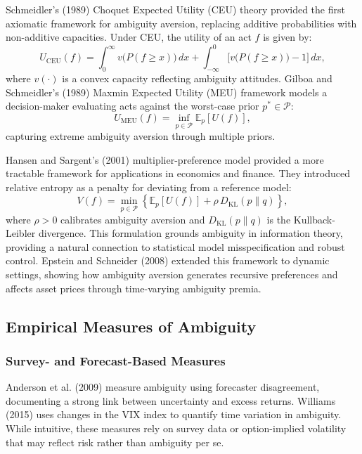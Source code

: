 \documentclass[preprint,12pt,authoryear]{elsarticle}
\begin{document}
Schmeidler's (1989) Choquet Expected Utility (CEU) theory provided the first axiomatic framework for ambiguity aversion, replacing additive probabilities with non-additive capacities. Under CEU, the utility of an act $f$ is given by:
\begin{equation}
U_{\mathrm{CEU}}(f)=\int_0^\infty v\bigl(P(f\ge x)\bigr)\,dx + \int_{-\infty}^0 \bigl[v\bigl(P(f\ge x)\bigr)-1\bigr]\,dx,
\end{equation}
where $v(\cdot)$ is a convex capacity reflecting ambiguity attitudes. Gilboa and Schmeidler's (1989) Maxmin Expected Utility (MEU) framework models a decision-maker evaluating acts against the worst-case prior $p^*\in\mathcal{P}$:
\begin{equation}
U_{\mathrm{MEU}}(f)=\inf_{p\in\mathcal{P}}\mathbb{E}_p[U(f)],
\end{equation}
capturing extreme ambiguity aversion through multiple priors.

Hansen and Sargent's (2001) multiplier-preference model provided a more tractable framework for applications in economics and finance. They introduced relative entropy as a penalty for deviating from a reference model:
\begin{equation}
V(f)=\min_{p\in\mathcal{P}}\left\{\mathbb{E}_p[U(f)] + \rho\,D_{\mathrm{KL}}(p\|q)\right\},
\end{equation}
where $\rho>0$ calibrates ambiguity aversion and $D_{\mathrm{KL}}(p\|q)$ is the Kullback-Leibler divergence. This formulation grounds ambiguity in information theory, providing a natural connection to statistical model misspecification and robust control. Epstein and Schneider (2008) extended this framework to dynamic settings, showing how ambiguity aversion generates recursive preferences and affects asset prices through time-varying ambiguity premia.

\subsection{Empirical Measures of Ambiguity}

\subsubsection{Survey- and Forecast-Based Measures}
Anderson et al. (2009) measure ambiguity using forecaster disagreement, documenting a strong link between uncertainty and excess returns. Williams (2015) uses changes in the VIX index to quantify time variation in ambiguity. While intuitive, these measures rely on survey data or option-implied volatility that may reflect risk rather than ambiguity per se.
\end{document}
